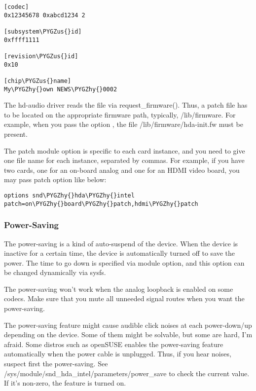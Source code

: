 \documentclass[a4paper,8pt,english]{sphinxmanual}
\def\PYGZus{\char`\_}
\def\PYGZhy{\char`\-}
\begin{document}
\begin{Verbatim}[commandchars=\\\{\}]
[codec]
0x12345678 0xabcd1234 2

[subsystem\PYGZus{}id]
0xffff1111

[revision\PYGZus{}id]
0x10

[chip\PYGZus{}name]
My\PYGZhy{}own NEWS\PYGZhy{}0002
\end{Verbatim}

The hd-audio driver reads the file via request\_firmware().  Thus,
a patch file has to be located on the appropriate firmware path,
typically, /lib/firmware.  For example, when you pass the option
, the file /lib/firmware/hda-init.fw must be
present.

The patch module option is specific to each card instance, and you
need to give one file name for each instance, separated by commas.
For example, if you have two cards, one for an on-board analog and one
for an HDMI video board, you may pass patch option like below:

\begin{Verbatim}[commandchars=\\\{\}]
options snd\PYGZhy{}hda\PYGZhy{}intel patch=on\PYGZhy{}board\PYGZhy{}patch,hdmi\PYGZhy{}patch
\end{Verbatim}


\subsubsection{Power-Saving}
\label{sound/hd-audio/notes:power-saving}
The power-saving is a kind of auto-suspend of the device.  When the
device is inactive for a certain time, the device is automatically
turned off to save the power.  The time to go down is specified via
 module option, and this option can be changed dynamically
via sysfs.

The power-saving won't work when the analog loopback is enabled on
some codecs.  Make sure that you mute all unneeded signal routes when
you want the power-saving.

The power-saving feature might cause audible click noises at each
power-down/up depending on the device.  Some of them might be
solvable, but some are hard, I'm afraid.  Some distros such as
openSUSE enables the power-saving feature automatically when the power
cable is unplugged.  Thus, if you hear noises, suspect first the
power-saving.  See /sys/module/snd\_hda\_intel/parameters/power\_save to
check the current value.  If it's non-zero, the feature is turned on.
\end{document}

